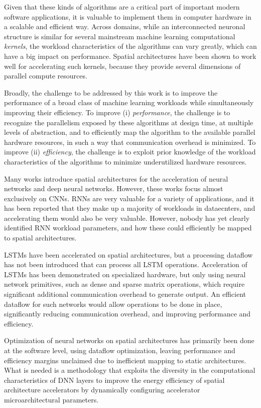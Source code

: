 Given that these kinds of algorithms are a critical part of important modern software applications, it is valuable to implement them in computer hardware in a scalable and efficient way.
Across domains, while an interconnected neuronal structure is similar for several mainstream machine learning computational \textit{kernels}, the workload characteristics of the algorithms can vary greatly, which can have a big impact on performance\cn.
Spatial architectures have been shown to work well for accelerating such kernels, because they provide several dimensions of parallel compute resources.

Broadly, the challenge to be addressed by this work is to improve the performance of a broad class of machine learning workloads while simultaneously improving their efficiency.
To improve (i) \textit{performance}, the challenge is to recognize the parallelism exposed by these algorithms at design time, at multiple levels of abstraction, and to efficiently map the algorithm to the available parallel hardware resources, in such a way that communication overhead is minimized.
To improve (ii) \textit{efficiency}, the challenge is to exploit prior knowledge of the workload characteristics of the algorithms to minimize underutilized hardware resources.

Many works introduce spatial architectures for the acceleration of neural networks and deep neural networks.
However, these works focus almost exclusively on CNNs.
RNNs are very valuable for a variety of applications, and it has been reported that they make up a majority of workloads in dataecnters, and accelerating them would also be very valuable.
However, nobody has yet clearly identified RNN workload parameters, and how these could efficiently be mapped to spatial architectures.

LSTMs have been accelerated on spatial architectures, but a processing dataflow has not been introduced that can process all LSTM operations.
Acceleration of LSTMs has been demonstrated on specialized hardware, but only using neural network primitives, such as dense and sparse matrix operations, which require significant additional communication overhead to generate output\cn. 
An efficient dataflow for such networks would allow operations to be done in place, significantly reducing communication overhead, and improving performance and efficiency.

Optimization of neural networks on spatial architectures has primarily been done at the software level, using dataflow optimization, leaving performance and efficiency margins unclaimed due to inefficient mapping to static architectures.
What is needed is a methodology that exploits the diversity in the computational characteristics of DNN layers to improve the energy efficiency of spatial architecture accelerators by dynamically configuring accelerator microarchitectural parameters.

